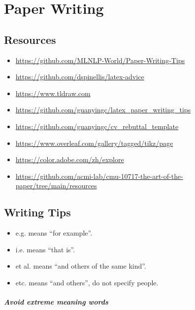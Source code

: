 \chapter{Paper Writing}\label{chp:paper_writing}
\minitoc


\section{Resources}

\begin{itemize}
	\item \url{https://github.com/MLNLP-World/Paper-Writing-Tips}
	\item \url{https://github.com/dspinellis/latex-advice}
	\item \url{https://www.tldraw.com}
	\item \url{https://github.com/guanyingc/latex_paper_writing_tips}
	\item \url{https://github.com/guanyingc/cv_rebuttal_template}
	\item \url{https://www.overleaf.com/gallery/tagged/tikz/page}
	\item \url{https://color.adobe.com/zh/explore}
	\item \url{https://github.com/acmi-lab/cmu-10717-the-art-of-the-paper/tree/main/resources}
\end{itemize}


\section{Writing Tips}


\begin{itemize}
	\item e.g. means \enquote{for example}.
	\item i.e. means \enquote{that is}.
	\item et al. means \enquote{and others of the same kind}.
	\item etc. means \enquote{and others}, do not specify people.
\end{itemize}

\paragraph{Avoid extreme meaning words}

